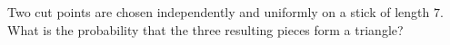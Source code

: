 Two cut points are chosen independently and uniformly on a stick of length $7$. What is the probability that the three resulting pieces form a triangle?
